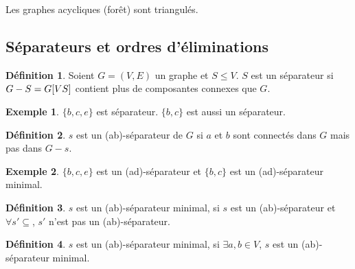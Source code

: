 \documentclass{book}
\theoremstyle{definition}
\newtheorem{definition}{Définition}
\newtheorem{example}{Exemple}
\numberwithin{lemma}{subsection}
\numberwithin{theorem}{subsection}
\numberwithin{definition}{subsection}
\numberwithin{proposition}{subsection}
\numberwithin{corollary}{subsection}
\numberwithin{property}{subsection}
\numberwithin{example}{subsection}
\numberwithin{heuristique}{subsection}
\numberwithin{scenario}{subsection}
\begin{document}
Les graphes acycliques (forêt) sont triangulés.

\subsection{Séparateurs et ordres d'éliminations}

\begin{definition}
Soient $G = (V, E)$ un graphe et $S \leqslant V$. $S$ est un séparateur si $G-S = G[V\\S]$ contient plus de composantes connexes que $G$.
\end{definition}

\begin{example}

$\{b, c, e \}$ est séparateur. $\{b, c\}$ est aussi un séparateur.
\end{example}

\begin{definition}
$s$ est un (ab)-séparateur de $G$ si $a$ et $b$ sont connectés dans $G$ mais pas dans $G-s$.
\end{definition}

\begin{example}
$\{b, c, e\}$ est un (ad)-séparateur et $\{ b, c\}$ est un (ad)-séparateur minimal.
\end{example}

\begin{definition}
$s$ est un (ab)-séparateur minimal, si $s$ est un (ab)-séparateur et $\forall s' \subseteq  $, $s'$ n'est pas un (ab)-séparateur.
\end{definition}

\begin{definition}
$s$ est un (ab)-séparateur minimal, si $\exists a, b \in V$, $s$ est un (ab)-séparateur minimal. 
\end{definition}
\end{document}
